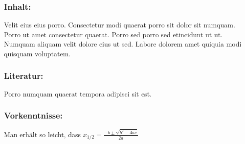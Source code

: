 \subsubsection*{\Large Inhalt:}
Velit eius eius porro. Consectetur modi quaerat porro sit dolor sit numquam. Porro ut amet consectetur quaerat. Porro sed porro sed etincidunt ut ut. Numquam aliquam velit dolore eius ut sed. Labore dolorem amet quiquia modi quisquam voluptatem.
\subsubsection*{\Large Literatur:}
Porro numquam quaerat tempora adipisci sit est.
\subsubsection*{\Large Vorkenntnisse:}
Man erhält so leicht, dass $x_{1/2} = \frac{-b \pm \sqrt{b^2 - 4ac}}{2a}$
